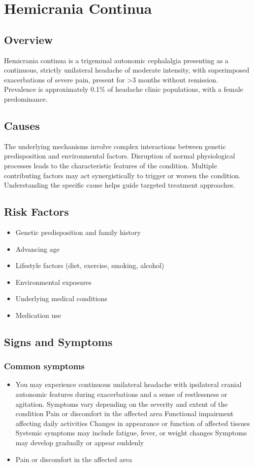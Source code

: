 \chapter{Hemicrania Continua}
\label{sec:Hemicrania Continua}

\section{Overview}
Hemicrania continua is a trigeminal autonomic cephalalgia presenting as a continuous, strictly unilateral headache of moderate intensity, with superimposed exacerbations of severe pain, present for >3 months without remission. Prevalence is approximately 0.1\% of headache clinic populations, with a female predominance.
\section{Causes}
The underlying mechanisms involve complex interactions between genetic predisposition and environmental factors. Disruption of normal physiological processes leads to the characteristic features of the condition. Multiple contributing factors may act synergistically to trigger or worsen the condition. Understanding the specific cause helps guide targeted treatment approaches.
\section{Risk Factors}


\begin{itemize}[noitemsep]
  \item Genetic predisposition and family history
  \item Advancing age
  \item Lifestyle factors (diet, exercise, smoking, alcohol)
  \item Environmental exposures
  \item Underlying medical conditions
  \item Medication use
\end{itemize}
\section{Signs and Symptoms}

\subsection{Common symptoms}
\begin{itemize}[noitemsep]
  \item You may experience continuous unilateral headache with ipsilateral cranial autonomic features during exacerbations and a sense of restlessness or agitation. Symptoms vary depending on the severity and extent of the condition Pain or discomfort in the affected area Functional impairment affecting daily activities Changes in appearance or function of affected tissues Systemic symptoms may include fatigue, fever, or weight changes Symptoms may develop gradually or appear suddenly
  \item Pain or discomfort in the affected area
  \end{itemize}

